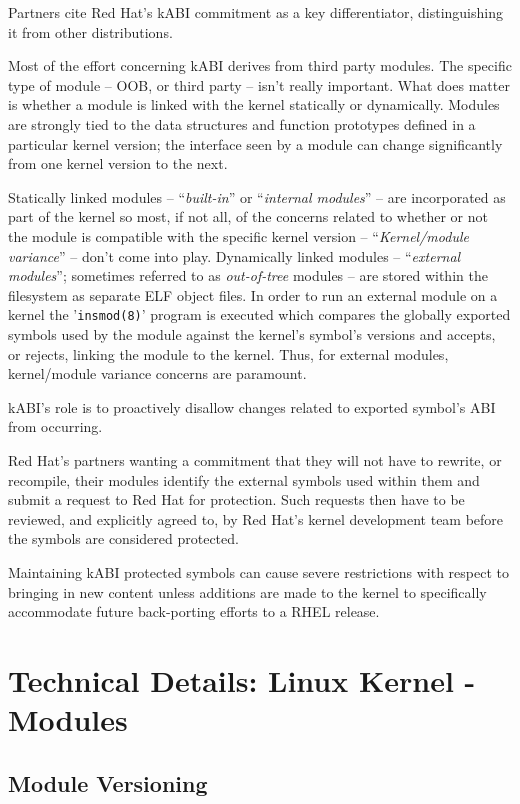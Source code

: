 \documentclass[10pt,oneside,english]{book}
\begin{document}
Partners cite Red Hat's kABI commitment as a key differentiator, distinguishing
it from other distributions.

Most of the effort concerning kABI derives from third party modules.
The specific type of module -- OOB, or third party -- isn't really
important. What does matter is whether a module is linked with the
kernel statically or dynamically. Modules are strongly tied to the
data structures and function prototypes defined in a particular kernel
version; the interface seen by a module can change significantly from
one kernel version to the next.

Statically linked modules -- ``\emph{built-in}'' or ``\emph{internal
modules}'' -- are incorporated as part of the kernel so most, if
not all, of the concerns related to whether or not the module is compatible
with the specific kernel version -- ``\emph{Kernel/module variance}''
-- don't come into play. Dynamically linked modules -- ``\emph{external
modules}''; sometimes referred to as \emph{out-of-tree} modules --
are stored within the filesystem as separate ELF object files. In
order to run an external module on a kernel the '\texttt{insmod(8)}'
program is executed which compares the globally exported symbols used
by the module against the kernel's symbol's versions and accepts,
or rejects, linking the module to the kernel. Thus, for external modules,
kernel/module variance concerns are paramount.

kABI's role is to proactively disallow changes related to exported
symbol's ABI from occurring.

Red Hat's partners wanting a commitment that they will not have to
rewrite, or recompile, their modules identify the external symbols
used within them and submit a request to Red Hat for protection. Such
requests then have to be reviewed, and explicitly agreed to, by Red
Hat's kernel development team before the symbols are considered protected.

Maintaining kABI protected symbols can cause severe restrictions with
respect to bringing in new content unless additions are made to the
kernel to specifically accommodate future back-porting efforts to
a RHEL release.

\chapter{Technical Details: Linux Kernel - Modules}

\section{Module Versioning}
\end{document}
